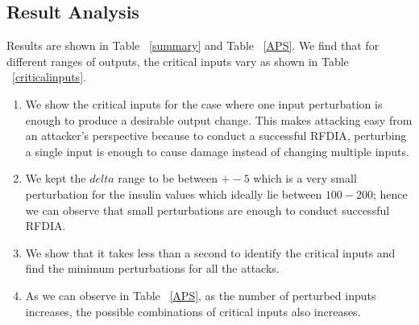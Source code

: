 \subsection{Result Analysis}
Results are shown in Table ~\ref{summary} and Table ~\ref{APS}. 
We find that for different ranges of outputs, the critical inputs vary as shown in Table ~\ref{criticalinputs}.         
\begin{enumerate}
	\item We show the critical inputs for the case where one input perturbation is enough to produce a desirable output change. 
	This makes attacking easy from an attacker's perspective because to conduct a successful \ac{RFDIA}, perturbing a single input is enough to cause damage instead of changing multiple inputs. 
	\item We kept the $delta$ range  to be between $+-5$ which is a very small perturbation for the insulin values which ideally lie between $100-200$; hence we can observe that small perturbations are enough to conduct successful \ac{RFDIA}.  
	\item  We show that it takes less than a second to identify the critical inputs and find the minimum perturbations for all the attacks.
	\item As we can observe in Table ~\ref{APS}, as the number of perturbed inputs increases, the possible combinations of critical inputs also increases. 
	
\end{enumerate}


 













